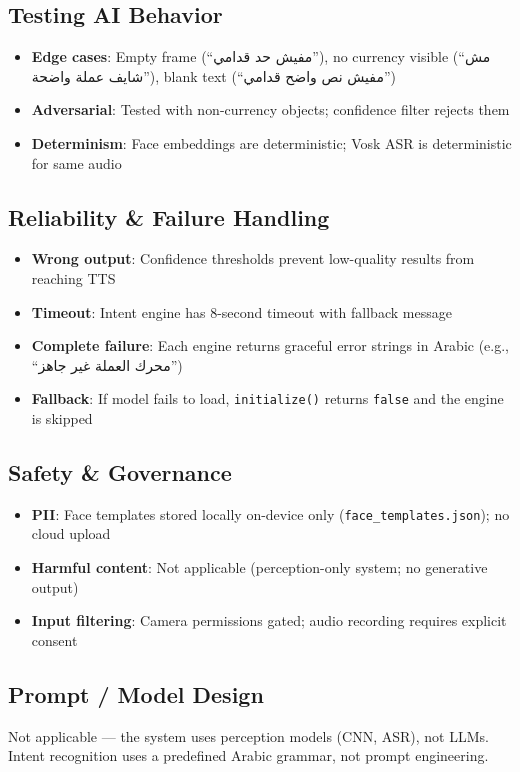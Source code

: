 \documentclass[12pt,a4paper]{article}
\begin{document}
\subsection{Testing AI Behavior}
\begin{itemize}
  \item \textbf{Edge cases}: Empty frame (``مفيش حد قدامي''), no currency visible (``مش شايف عملة واضحة''), blank text (``مفيش نص واضح قدامي'')
  \item \textbf{Adversarial}: Tested with non-currency objects; confidence filter rejects them
  \item \textbf{Determinism}: Face embeddings are deterministic; Vosk ASR is deterministic for same audio
\end{itemize}

\subsection{Reliability \& Failure Handling}
\begin{itemize}
  \item \textbf{Wrong output}: Confidence thresholds prevent low-quality results from reaching TTS
  \item \textbf{Timeout}: Intent engine has 8-second timeout with fallback message
  \item \textbf{Complete failure}: Each engine returns graceful error strings in Arabic (e.g., ``محرك العملة غير جاهز'')
  \item \textbf{Fallback}: If model fails to load, \texttt{initialize()} returns \texttt{false} and the engine is skipped
\end{itemize}

\subsection{Safety \& Governance}
\begin{itemize}
  \item \textbf{PII}: Face templates stored locally on-device only (\texttt{face\_templates.json}); no cloud upload
  \item \textbf{Harmful content}: Not applicable (perception-only system; no generative output)
  \item \textbf{Input filtering}: Camera permissions gated; audio recording requires explicit consent
\end{itemize}

\subsection{Prompt / Model Design}
Not applicable --- the system uses perception models (CNN, ASR), not LLMs. Intent recognition uses a predefined Arabic grammar, not prompt engineering.
\end{document}
